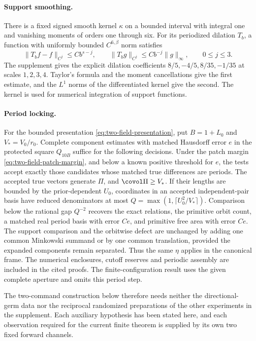 \paragraph{Support smoothing.}
There is a fixed signed smooth kernel $\kappa$ on a bounded interval
with integral one and vanishing moments of orders one through six.
For its periodized dilation $T_b$, a function with uniformly bounded
$C^{6,\beta}$ norm satisfies
\[
 \|T_bf-f\|_{C^j}\le Cb^{s-j},\qquad
 \|T_bg\|_{C^j}\le Cb^{-j}\|g\|_\infty,
 \qquad 0\le j\le3.
\]
The supplement gives the explicit dilation coefficients
$8/5,-4/5,8/35,-1/35$ at scales $1,2,3,4$. Taylor's formula and
the moment cancellations give the first estimate, and the $L^1$
norms of the differentiated kernel give the second. The kernel is
used for numerical integration of support functions.

\paragraph{Period locking.}
For the bounded presentation \eqref{eq:two-field-presentation},
put $B=1+L_0$ and $V_*=V_0/r_0$. Complete component estimates with
matched Hausdorff error $e$ in the protected square $Q_{10B}$ suffice
for the following decisions. Under the patch margin
\eqref{eq:two-field-patch-margin}, and below a known positive
threshold for $e$, the tests accept exactly those candidates whose
matched true differences are periods. The accepted true
vectors generate $\Pi$, and $\covol\Pi\ge V_*$. If their lengths
are bounded by the prior-dependent $U_0$, coordinates in an accepted
independent-pair basis have reduced denominators at most
$Q=\max(1,\lceil U_0^2/V_*\rceil)$. Comparison below the rational
gap $Q^{-2}$ recovers the exact relations, the primitive orbit
count, a matched real period basis with error $Ce$, and primitive
free area with error $Ce$. The support comparison and the orbitwise
defect are unchanged by adding one common Minkowski summand or by
one common translation, provided the expanded components remain
separated. Thus the same $\eta$ applies in the canonical frame.
The numerical enclosures, cutoff reserves and periodic assembly
are included in the cited proofs. The finite-configuration result
uses the given complete aperture and omits this period step.

The two-command construction below therefore needs neither the
directional-germ data nor the reciprocal randomized preparations of
the other experiments in the supplement. Each auxiliary hypothesis
has been stated here, and each observation required for the current
finite theorem is supplied by its own two fixed forward channels.
